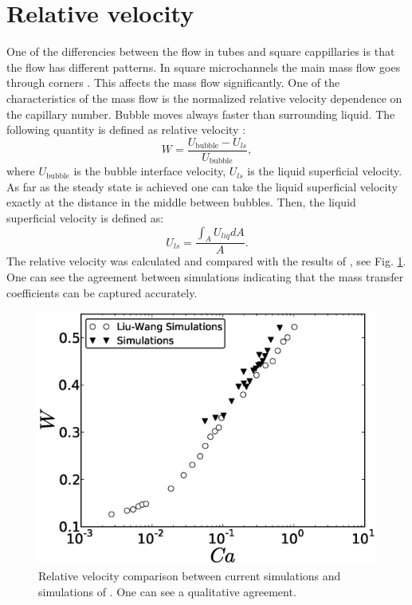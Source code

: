 \documentclass{article}
\begin{document}
\section{Relative velocity}
One of the differencies between the flow in tubes and square cappillaries is that the flow has
different patterns. In square microchannels the main mass flow goes through corners
\cite{heil-threedim,wang-non-circular}. This affects the mass flow significantly. One of the
characteristics of the mass flow is the normalized relative velocity dependence on the capillary
number. Bubble moves always faster than surrounding liquid. The following quantity is defined as
relative velocity \cite{cerro-bubble-train}:
\begin{equation}
W=\frac{U_{\mathrm{bubble}}-U_{ls}}{U_{\mathrm{bubble}}},
\end{equation}
where $U_{\mathrm{bubble}}$ is the bubble interface velocity, $U_{ls}$ is the liquid superficial
velocity. As far as the steady state is achieved one can take the liquid superficial velocity
exactly at the distance in the middle between bubbles. Then, the liquid superficial velocity is
defined as:
\begin{equation}
U_{ls}=\frac{\int_{A}{U_{liq}dA}}{A}.
\end{equation}
The relative velocity was calculated and compared with the results of \citet{wang-non-circular},
see Fig. \ref{fig:relative:velocity}. One can see the agreement between simulations indicating that
the mass transfer coefficients can be captured accurately. 
\begin{figure}[ht]
\includegraphics[width=\textwidth]{Figures/relative_velocity.eps}
\caption{Relative velocity comparison between current simulations and simulations of
\citet{wang-non-circular}. One can see a qualitative agreement. \label{fig:relative:velocity}}
\end{figure}
\end{document}
